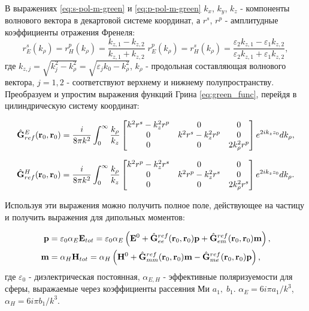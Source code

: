 В выражениях \eqref{eq:s-pol-m-green} и \eqref{eq:p-pol-m-green} $k_x$, $k_y$, $k_z$ - компоненты волнового вектора в декартовой системе координат, а $r^s$, $r^p$ - амплитудные коэффициенты отражения Френеля:
\begin{equation}
    r_E^s(k_\rho) = r^p_H (k_\rho) = \frac{k_{z,1} - k_{z,2}}{k_{z,1}+k_{z,2}} \; r_E^p(k_\rho) = r_H^s (k_\rho) = \frac{\varepsilon_2 k_{z,1} - \varepsilon_1 k_{z,2}}{\varepsilon_2 k_{z,1} + \varepsilon_1 k_{z,2}}, \label{eq:frenel_coeff}
\end{equation} 
где $k_{z,j} = \sqrt{k^2_j - k_\rho^2} = \sqrt{\varepsilon_j k_0 - k_\rho^2}$, $k_\rho$ - продольная составляющая волнового вектора, $j=1,2$ - соответствуют верхнему и нижнему полупространству. Преобразуем и упростим выражения функций Грина \eqref{eq:green_func}, перейдя в цилиндрическую систему координат:

\begin{equation}
    \hat{\vb{G}}_{ref}^E (\vb{r}_0, \vb{r}_0) = \frac{i}{ 8 \pi k^2}\int_0^{\infty} \frac{k_\rho}{k_z} \begin{bmatrix}
        k^2 r^s - k_z^2 r^p & 0 & 0\\
        0 & k^2 r^s - k_z^2 r^p & 0 \\
        0& 0 & 2 k_\rho^2 r^p \\
    \end{bmatrix}
    e^{2ik_z z_0} dk_\rho,
\end{equation}

\begin{equation}
    \hat{\vb{G}}_{ref}^H (\vb{r}_0, \vb{r}_0) = \frac{i}{8 \pi k^2}\int_0^{\infty} \frac{k_\rho}{k_z} \begin{bmatrix}
        k^2 r^p - k_z^2 r^s & 0 & 0\\
        0 & k^2 r^p - k_z^2 r^s & 0 \\
        0& 0 & 2 k_\rho^2 r^s \\
    \end{bmatrix}
    e^{2ik_z z_0} dk_\rho.
\end{equation}

Используя эти выражения можно получить полное поле, действующее на частицу и получить выражения для дипольных моментов:

\begin{align}
    \vb{p} &= \varepsilon_0 \alpha_E \vb{E}_{tot} = \varepsilon_0 \alpha_E \left(\vb{E}^0 + \hat{\vb{G}}^{ref}_{ee} ( \vb{r}_0, \vb{r}_0) \vb{p} +  \hat{\vb{G}}^{ref}_{em} (\vb{r}_0, \vb{r}_0) \vb{m} \right),\\
    \vb{m} &= \alpha_H \vb{H}_{tot} = \alpha_H \left(\vb{H}^0   + \hat{\vb{G}}^{ref}_{mm} (\vb{r}_0, \vb{r}_0) \vb{m} -  \hat{\vb{G}}^{ref}_{me} (\vb{r}_0, \vb{r}_0) \vb{p}  \right),\label{eq:dipoles-full-field} 
\end{align}
где $\varepsilon_0$ - диэлектрическая постоянная, $\alpha_{E,H}$ - эффективные поляризуемости для сферы, выражаемые через коэффициенты рассеяния Ми $a_1,\;b_1$. $\alpha_E = 6i\pi a_1/k^3$, $\alpha_H = 6i\pi b_1/k^3$.

